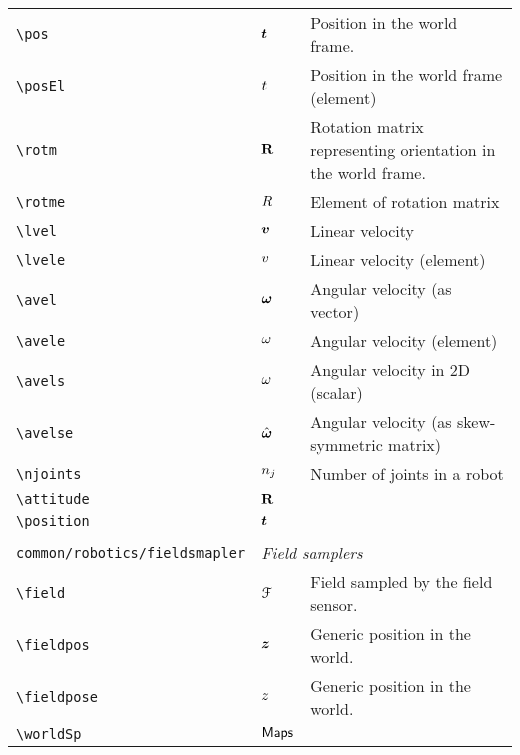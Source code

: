 \begin{longtable}{lll}
 {\color[rgb]{0.5,0.5,0.5}\texttt{\textbackslash pos}} & $\boldsymbol{t}$ &  Position in the world frame.\\ 
 {\color[rgb]{0.5,0.5,0.5}\texttt{\textbackslash posEl}} & $t$ &  Position in the world frame (element)\\ 
 {\color[rgb]{0.5,0.5,0.5}\texttt{\textbackslash rotm}} & $\mathbf{R}$ &  Rotation matrix representing orientation in the world frame.\\ 
 {\color[rgb]{0.5,0.5,0.5}\texttt{\textbackslash rotme}} & $R$ &  Element of rotation matrix\\ 
 {\color[rgb]{0.5,0.5,0.5}\texttt{\textbackslash lvel}} & $\boldsymbol{v}$ &  Linear velocity\\ 
 {\color[rgb]{0.5,0.5,0.5}\texttt{\textbackslash lvele}} & $v$ &  Linear velocity (element)\\ 
 {\color[rgb]{0.5,0.5,0.5}\texttt{\textbackslash avel}} & $\boldsymbol{\omega}$ &  Angular velocity (as vector)\\ 
 {\color[rgb]{0.5,0.5,0.5}\texttt{\textbackslash avele}} & $\omega$ &  Angular velocity (element)\\ 
 {\color[rgb]{0.5,0.5,0.5}\texttt{\textbackslash avels}} & $\omega$ &  Angular velocity in 2D (scalar)\\ 
 {\color[rgb]{0.5,0.5,0.5}\texttt{\textbackslash avelse}} & $\hat{\boldsymbol{\omega}}$ &  Angular velocity (as skew-symmetric matrix)\\ 
 {\color[rgb]{0.5,0.5,0.5}\texttt{\textbackslash njoints}} & $n_{j}$ &  Number of joints in a robot\\ 
 {\color[rgb]{0.5,0.5,0.5}\texttt{\textbackslash attitude}} & $\mathbf{R}$ & \\ 
 {\color[rgb]{0.5,0.5,0.5}\texttt{\textbackslash position}} & $\boldsymbol{t}$ & \\ 
  &  & \\ 
 {\color[rgb]{0.5,0.5,0.5}\texttt{common/robotics/fieldsmapler}} & \multicolumn{2}{l}{\emph{Field samplers}}\\ 
 \hline
{\color[rgb]{0.5,0.5,0.5}\texttt{\textbackslash field}} & $\mathcal{F}$ &  Field sampled by the field sensor.\\ 
 {\color[rgb]{0.5,0.5,0.5}\texttt{\textbackslash fieldpos}} & $\boldsymbol{z}$ &  Generic position in the world.\\ 
 {\color[rgb]{0.5,0.5,0.5}\texttt{\textbackslash fieldpose}} & $z$ &  Generic position in the world.\\ 
 {\color[rgb]{0.5,0.5,0.5}\texttt{\textbackslash worldSp}} & $\mathsf{Maps}$ & \\ 

\end{longtable}
